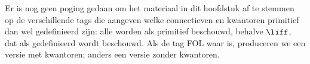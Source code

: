 \documentclass[../../../include/open-logic-chapter]{subfiles}
\begin{document}
      {}
      {}

\begin{editorial}
  Er is nog geen poging gedaan om het materiaal in dit hoofdstuk af te
  stemmen op de verschillende tags die aangeven welke connectieven en
  kwantoren primitief dan wel gedefinieerd zijn: alle worden als
  primitief beschouwd, behalve $\liff$, dat als gedefinieerd wordt
  beschouwd. Als de tag FOL waar is, produceren we een versie met
  kwantoren; anders een versie zonder kwantoren.
\end{editorial}














\OLEndChapterHook
\end{document}

